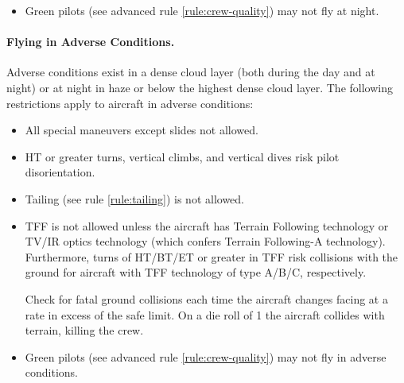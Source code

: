 \begin{advancedrules}
{\begin{itemize}
    \item{} Green pilots (see advanced rule \ref{rule:crew-quality}) may not fly at night.

\end{itemize}

\paragraph{Flying in Adverse Conditions.}

Adverse conditions exist in a dense cloud layer (both during the day and at night) or at night in haze or below the highest dense cloud layer. The following restrictions apply to aircraft in adverse conditions:

\begin{itemize}

    \item{} All special maneuvers except slides not allowed.

    \item{} HT or greater turns, vertical climbs, and vertical dives risk pilot disorientation.

    \item{} Tailing (see rule \ref{rule:tailing}) is not allowed.

    \item{} TFF is not allowed unless the aircraft has Terrain Following technology or TV/IR optics technology (which confers Terrain Following-A technology). Furthermore, turns of HT/BT/ET or greater in TFF risk collisions with the ground for aircraft with TFF technology of type A/B/C, respectively.
    
    Check for fatal ground collisions each time the aircraft changes facing at a rate in excess of the safe limit. On a die roll of 1 the aircraft collides with terrain, killing the crew.

    \item{} Green pilots (see advanced rule \ref{rule:crew-quality}) may not fly in adverse conditions.

\end{itemize}


}
\end{advancedrules}
